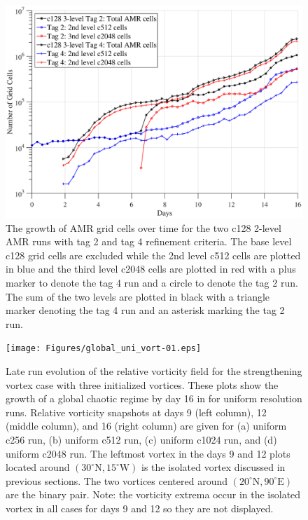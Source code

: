 \documentclass{ametsoc}
\begin{document}
\begin{figure}
   \centerline{%
   \noindent
   \includegraphics[width=\textwidth]{Figures/c128_3l4_Tag2vs4_compare.eps}}
   \caption{The growth of AMR grid cells over time for the two c128 2-level AMR runs 
   with tag 2 and tag 4 refinement criteria. The base level c128 grid cells are excluded
   while the 2nd level c512 cells are plotted in blue and the third level c2048 cells are
   plotted in red with a plus marker to denote the tag 4 run and a circle to denote the
   tag 2 run.  The sum of the two levels are plotted in black with a triangle marker denoting
   the tag 4 run and an asterisk marking the tag 2 run. 
   }
   \label{fig.grid_num_c128}
\end{figure}

\begin{figure}
   \centerline{%
   \noindent
   \texttt{[image: Figures/global\_uni\_vort-01.eps]}}
   \caption{Late run evolution of the relative vorticity field for the 
   strengthening vortex case with three initialized vortices. These plots show
   the growth of a global chaotic regime by day 16 in for uniform resolution
   runs. Relative vorticity snapshots at days 9 (left column), 12 (middle column), 
   and 16 (right column) are given for
   (a) uniform c256 run, (b) uniform c512 run, (c) uniform c1024 run, and
   (d) uniform c2048 run. The leftmost vortex in the days 9 and 12 plots
   located around $(30^\circ \mathrm{N}, 15^\circ \mathrm{W})$ is the isolated
   vortex discussed in previous sections. The two vortices centered around
   $(20^\circ \mathrm{N}, 90^\circ \mathrm{E})$ are the binary pair. Note: the
   vorticity extrema occur in the isolated vortex in all cases for days 9 and 12 so they are 
   not displayed.}
   \label{fig:threevort_uni}
\end{figure}
\end{document}

